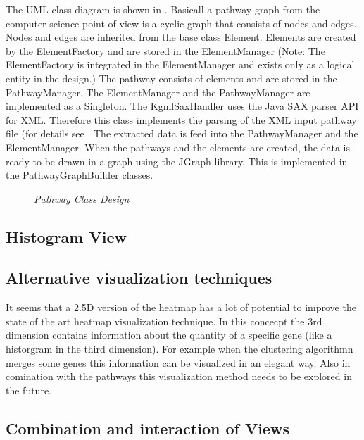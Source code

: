 The UML class diagram is shown in .
Basicall a pathway graph from the computer science point of view is a cyclic graph that consists of nodes and edges.
Nodes and edges are inherited from the base class Element.
Elements are created by the ElementFactory and are stored in the ElementManager (Note: The ElementFactory is integrated in the
ElementManager and exists only as a logical entity in the design.) 
The pathway consists of elements and are stored in the PathwayManager.
The ElementManager and the PathwayManager are implemented as a Singleton. 
The KgmlSaxHandler uses the Java SAX parser API for XML. Therefore this class implements the parsing of the XML input pathway file (for details see . The extracted data is feed into the PathwayManager and the ElementManager.
When the pathways and the elements are created, the data is ready to be drawn in a graph using the JGraph library.
This is implemented in the PathwayGraphBuilder classes.

\begin{figure}[ht]
\centering
{} 
\caption[Pathway Class Design]{\textit{Pathway Class Design}} 
\label{gfx:pathway_class_design}
\end{figure}

\subsection{Histogram View}

\subsection{Alternative visualization techniques}

It seems that a 2.5D version of the heatmap has a lot of potential to improve the state of the art heatmap visualization technique.
In this concecpt the 3rd dimension contains information about the quantity of a specific gene (like a historgram in the third dimension). For example when the clustering algorithmn merges some genes this information can be visualized in an elegant way.
Also in comination with the pathways this visualization method needs to be explored in the future.

\subsection{Combination and interaction of Views}




